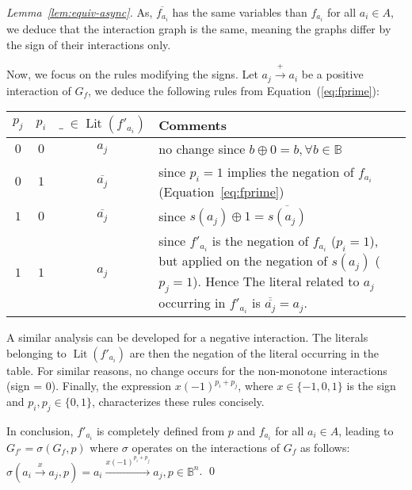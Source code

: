 \documentclass[12pt]{elsarticle}
\newcommand{\Bset}[0]{\mathbb{B}}
\renewcommand{\lnot}[1]{\overline{#1}}
\newcommand{\lxor}[0]{\oplus}
\begin{document}
\begin{proof}[Lemma~\ref{lem:equiv-async}]
\noindent
As, $\lnot{f_{a_i}}$ has the same variables than $f_{a_i}$ for all $a_i \in A$, we deduce that the interaction graph is the same, meaning the graphs differ by the sign of their interactions only.

\medskip
\noindent
Now, we focus on the rules modifying the signs.
 Let $a_j \stackrel{+}{\longrightarrow} a_i$ be a positive interaction of $G_f$, we deduce the following rules from Equation~(\ref{eq:fprime}): 

\begin{center}
\begin{tabular}{ c c c p{}}
 $p_j$ & $p_i$ & $ \_ \; \in \operatorname{Lit}(f'_{a_i})$ & Comments\\
\hline
$0$ & $0$ & $a_j$ & no change since $b \lxor 0 =b, \forall b \in \Bset$\\
$0$ & $1$ & $\lnot{a_j}$ & since $p_i=1$ implies the negation of $f_{a_i}$ (Equation~\ref{eq:fprime}) \\
$1$ & $0$ & $\lnot{a_j}$ & since $s(a_j) \lxor 1 = \lnot{s(a_j)}$ \\
$1$ & $1$ & $a_j$ & since $f'_{a_i}$ is the negation of $f_{a_i}$ ($p_i=1$), but applied on the negation of $s(a_j)$ ($p_j=1$). Hence 
The literal related to $a_j$ occurring in $f'_{a_i}$ is $\lnot{\lnot{a_j}}=a_j$. \\
\hline
\end{tabular}
\end{center}

\medskip
A similar analysis can be developed for a negative interaction. The literals belonging to $\operatorname{Lit}(f'_{a_i})$ are then the negation of the literal occurring in the table. For similar reasons, no change occurs for the non-monotone interactions (sign = $0$).
Finally, the expression $x (-1)^{p_i+p_j}$, where $x \in \{-1,0,1\}$ is the sign and $p_i,p_j \in \{0,1\}$, characterizes these rules concisely. 

In conclusion, 
$f'_{a_i}$ is completely defined from $p$ and $f_{a_i}$ for all $a_i \in A$, leading to $G_{f'} = \sigma(G_f,p)$ where $\sigma$ operates on the interactions of $G_f$ as follows: $\sigma(a_i \stackrel{x}{\longrightarrow} a_j,p) =a_i \stackrel{x(-1)^{p_i+p_j}}{\longrightarrow} a_j, p \in \Bset^n$.
\qed \end{proof}
\end{document}
